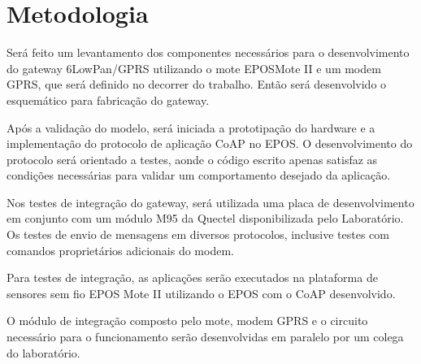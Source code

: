 \section{Metodologia}

Ser\'a feito um levantamento dos componentes necess\'arios para o desenvolvimento do gateway 6LowPan/GPRS utilizando o mote EPOSMote II e um modem GPRS, que ser\'a definido no decorrer do trabalho. Ent\~ao ser\'a desenvolvido o esquem\'atico para fabrica\c{c}\~ao do gateway.

Ap\'os a valida\c{c}\~ao do modelo, ser\'a iniciada a prototipa\c{c}\~ao do hardware e a implementa\c{c}\~ao do protocolo de aplica\c{c}\~ao CoAP no EPOS. O desenvolvimento do protocolo ser\'a orientado a testes, aonde o c\'odigo escrito apenas satisfaz as condi\c{c}\~oes necess\'arias para validar um comportamento desejado da aplica\c{c}\~ao.

Nos testes de integra\c{c}\~ao do gateway, ser\'a utilizada uma placa de desenvolvimento em conjunto com um m\'odulo M95 da Quectel disponibilizada pelo Laborat\'orio. Os testes de envio de mensagens em diversos protocolos, inclusive testes com comandos propriet\'arios adicionais do modem.

Para testes de integra\c{c}\~ao, as aplica\c{c}\~oes ser\~ao executados na plataforma de sensores sem fio EPOS Mote II utilizando o EPOS com o CoAP desenvolvido.

O m\'odulo de integra\c{c}\~ao composto pelo mote, modem GPRS e o circuito necess\'ario para o funcionamento ser\~ao desenvolvidas em paralelo por um colega do laborat\'orio.
